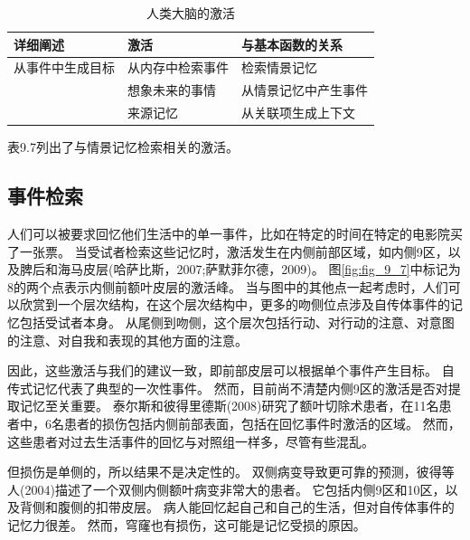 \begin{table}[htbp] 
	\newcommand{\tabincell}[2]{\begin{tabular}{@{}#1@{}}#2\end{tabular}} %
	\centering
	\caption{人类大脑的激活\label{tab:9_7}}
	\renewcommand\arraystretch{1.5}	%
	\begin{tabular}{lll}
		\toprule
		详细阐述 & 激活 & 与基本函数的关系\\
		\midrule
		从事件中生成目标 & 从内存中检索事件 & 检索情景记忆  \\
		& 想象未来的事情 & 从情景记忆中产生事件 \\
		& 来源记忆 & 从关联项生成上下文 \\
		\bottomrule
		
	\end{tabular}%
\end{table}%


表9.7列出了与情景记忆检索相关的激活。



\subsection{事件检索}
人们可以被要求回忆他们生活中的单一事件，比如在特定的时间在特定的电影院买了一张票。
当受试者检索这些记忆时，激活发生在内侧前部区域，如内侧9区，以及脾后和海马皮层(哈萨比斯，2007;萨默菲尔德，2009)。
图\ref{fig:fig_9_7}中标记为8的两个点表示内侧前额叶皮层的激活峰。
当与图中的其他点一起考虑时，人们可以欣赏到一个层次结构，在这个层次结构中，更多的吻侧位点涉及自传体事件的记忆包括受试者本身。
从尾侧到吻侧，这个层次包括行动、对行动的注意、对意图的注意、对自我和表现的其他方面的注意。
\par


因此，这些激活与我们的建议一致，即前部皮层可以根据单个事件产生目标。
自传式记忆代表了典型的一次性事件。
然而，目前尚不清楚内侧9区的激活是否对提取记忆至关重要。
泰尔斯和彼得里德斯(2008)研究了额叶切除术患者，在11名患者中，6名患者的损伤包括内侧前部表面，包括在回忆事件时激活的区域。
然而，这些患者对过去生活事件的回忆与对照组一样多，尽管有些混乱。
\par


但损伤是单侧的，所以结果不是决定性的。
双侧病变导致更可靠的预测，彼得等人(2004)描述了一个双侧内侧额叶病变非常大的患者。
它包括内侧9区和10区，以及背侧和腹侧的扣带皮层。
病人能回忆起自己和自己的生活，但对自传体事件的记忆力很差。
然而，穹窿也有损伤，这可能是记忆受损的原因。
\par


